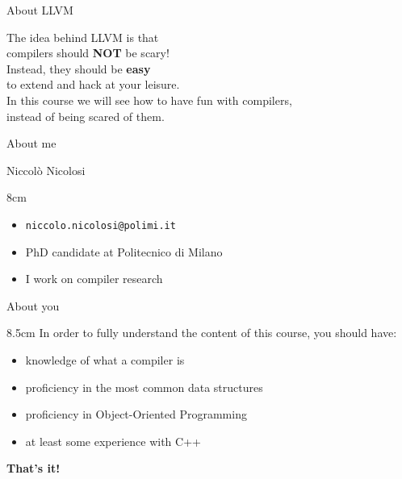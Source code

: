 \begin{frame}{About LLVM}
  \begin{center}
  	\vfill
  	\large
  	The idea behind LLVM is that \\ compilers should \textbf{NOT} be scary! \\
		\bigskip
		Instead, they should be \textbf{easy} \\ to extend and hack at your leisure. \\
		\bigskip
		In this course we will see how to have fun with compilers, \\instead of being scared of them.
		\vfill
  \end{center}
\end{frame}


\begin{frame}{About me}
  \begin{large}
  \begin{center}
    Niccolò Nicolosi
  \end{center}
  \end{large}
  \vspace{0.5em}
  \begin{center}
  \begin{varwidth}{8cm}
    \begin{itemize}
    \item \texttt{niccolo.nicolosi@polimi.it}
    \item PhD candidate at Politecnico di Milano
    \item I work on compiler research
  \end{itemize}
  \end{varwidth}
  \end{center}
\end{frame}


\begin{frame}{About you}
	\begin{center}
  \begin{varwidth}{8.5cm}
  In order to fully understand the content of this course,
  you should have:
  \smallskip
  \begin{itemize}
    \item knowledge of what a compiler is
    \item proficiency in the most common data structures
    \item proficiency in Object-Oriented Programming
    \item at least some experience with C++
  \end{itemize}
  \end{varwidth}
  \medskip
  \end{center}
   \begin{center}
  \textbf{\large That's it!}
  \end{center}
\end{frame}


